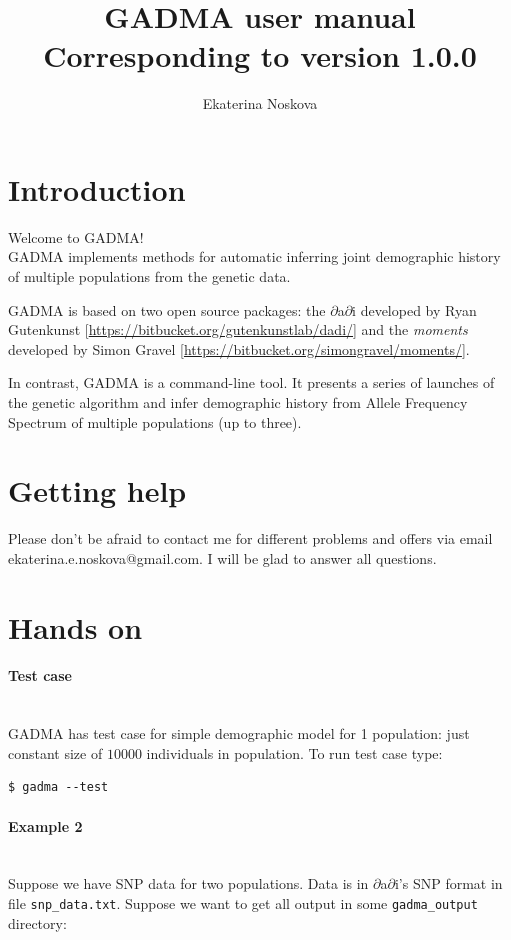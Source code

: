 \documentclass[12pt]{article}
\title{GADMA user manual \\ \normalsize  Corresponding to version 1.0.0}
\author{Ekaterina Noskova}
\date{}
\makeatletter
\newcommand{\dadi}{$\partial$a$\partial$i\xspace}
\newcommand{\moments}{\textit{moments}\xspace}
\newcommand{\py}[1]{\lstinline[language=Python, showstringspaces=False]@#1@}
\makeatother
\begin{document}
\maketitle
\tableofcontents
\clearpage


\section{Introduction}
Welcome to GADMA!\\

GADMA implements methods for automatic inferring joint demographic history of multiple populations from the genetic data.

GADMA is based on two open source packages: the \dadi developed by Ryan Gutenkunst [\url{https://bitbucket.org/gutenkunstlab/dadi/}] and the \moments developed by Simon Gravel [\url{https://bitbucket.org/simongravel/moments/}].

In contrast, GADMA is a command-line tool. It presents a series of launches of the genetic algorithm and infer demographic history from Allele Frequency Spectrum of multiple populations (up to three).

\section{Getting help}
Please don't be afraid to contact me for different problems and offers via email ekaterina.e.noskova@gmail.com. I will be glad to answer all questions. 

\section{Hands on}
\paragraph{Test case}\mbox{}\\
GADMA has test case for simple demographic model for 1 population: just constant size of $10000$ individuals in population. To run test case type:

\begin{lstlisting}
$ gadma --test
\end{lstlisting}

\paragraph{Example 2}\mbox{}\\
Suppose we have SNP data for two populations. Data is in \dadi's SNP format in file \py{snp_data.txt}. Suppose we want to get all output in some \py{gadma_output} directory:
\end{document}
